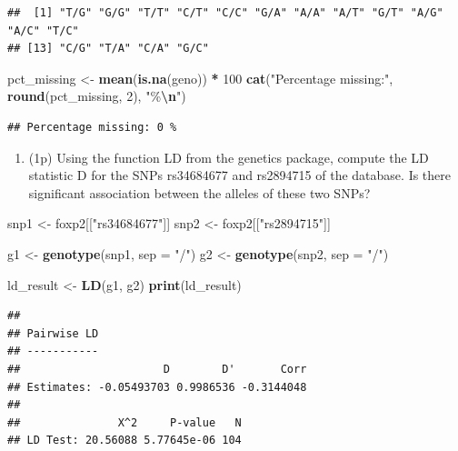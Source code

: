 \documentclass[
]{article}
\newenvironment{Shaded}{\begin{snugshade}}{\end{snugshade}}
\newcommand{\AttributeTok}[1]{\textcolor[rgb]{0.13,0.29,0.53}{#1}}
\newcommand{\DecValTok}[1]{\textcolor[rgb]{0.00,0.00,0.81}{#1}}
\newcommand{\FunctionTok}[1]{\textcolor[rgb]{0.13,0.29,0.53}{\textbf{#1}}}
\newcommand{\NormalTok}[1]{#1}
\newcommand{\OtherTok}[1]{\textcolor[rgb]{0.56,0.35,0.01}{#1}}
\newcommand{\SpecialCharTok}[1]{\textcolor[rgb]{0.81,0.36,0.00}{\textbf{#1}}}
\newcommand{\StringTok}[1]{\textcolor[rgb]{0.31,0.60,0.02}{#1}}
\providecommand{\tightlist}{%
  \setlength{\itemsep}{0pt}\setlength{\parskip}{0pt}}
\begin{document}
\begin{verbatim}
##  [1] "T/G" "G/G" "T/T" "C/T" "C/C" "G/A" "A/A" "A/T" "G/T" "A/G" "A/C" "T/C"
## [13] "C/G" "T/A" "C/A" "G/C"
\end{verbatim}

\begin{Shaded}
\begin{Highlighting}[]
\NormalTok{pct\_missing }\OtherTok{\textless{}{-}} \FunctionTok{mean}\NormalTok{(}\FunctionTok{is.na}\NormalTok{(geno)) }\SpecialCharTok{*} \DecValTok{100}
\FunctionTok{cat}\NormalTok{(}\StringTok{"Percentage missing:"}\NormalTok{, }\FunctionTok{round}\NormalTok{(pct\_missing, }\DecValTok{2}\NormalTok{), }\StringTok{"\%}\SpecialCharTok{\textbackslash{}n}\StringTok{"}\NormalTok{)}
\end{Highlighting}
\end{Shaded}

\begin{verbatim}
## Percentage missing: 0 %
\end{verbatim}

\begin{enumerate}
\def\labelenumi{\arabic{enumi}.}
\setcounter{enumi}{1}
\tightlist
\item
  (1p) Using the function LD from the genetics package, compute the LD
  statistic D for the SNPs rs34684677 and rs2894715 of the database. Is
  there significant association between the alleles of these two SNPs?
\end{enumerate}

\begin{Shaded}
\begin{Highlighting}[]
\NormalTok{snp1 }\OtherTok{\textless{}{-}}\NormalTok{ foxp2[[}\StringTok{"rs34684677"}\NormalTok{]]}
\NormalTok{snp2 }\OtherTok{\textless{}{-}}\NormalTok{ foxp2[[}\StringTok{"rs2894715"}\NormalTok{]]}

\NormalTok{g1 }\OtherTok{\textless{}{-}} \FunctionTok{genotype}\NormalTok{(snp1, }\AttributeTok{sep =} \StringTok{"/"}\NormalTok{)}
\NormalTok{g2 }\OtherTok{\textless{}{-}} \FunctionTok{genotype}\NormalTok{(snp2, }\AttributeTok{sep =} \StringTok{"/"}\NormalTok{)}

\NormalTok{ld\_result }\OtherTok{\textless{}{-}} \FunctionTok{LD}\NormalTok{(g1, g2)}
\FunctionTok{print}\NormalTok{(ld\_result)}
\end{Highlighting}
\end{Shaded}

\begin{verbatim}
## 
## Pairwise LD
## -----------
##                      D        D'       Corr
## Estimates: -0.05493703 0.9986536 -0.3144048
## 
##               X^2     P-value   N
## LD Test: 20.56088 5.77645e-06 104
\end{verbatim}
\end{document}
